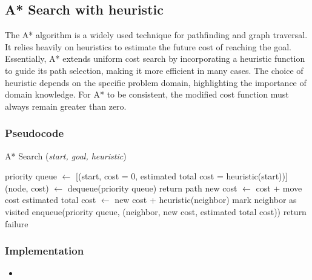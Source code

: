 \subsection{A* Search with heuristic}
\noindent The A* algorithm is a widely used technique for pathfinding and graph traversal. It relies heavily on heuristics to estimate the future cost of reaching the goal. Essentially, A* extends uniform cost search by incorporating a heuristic function to guide its path selection, making it more efficient in many cases. The choice of heuristic depends on the specific problem domain, highlighting the importance of domain knowledge. For A* to be consistent, the modified cost function must always remain greater than zero.

\subsubsection{Pseudocode}
\begin{algorithm}[H]
	\caption{A* Search (\textit{start, goal, heuristic})}
	\label{alg:astar}
	\begin{algorithmic}[1]
		\State priority queue \(\gets\) [(start, cost = 0, estimated total cost = heuristic(start))]
		\State (node, cost) \(\gets\) dequeue(priority queue)
		\State return path
		\EndIf
		\State new cost \(\gets\) cost + move cost
		\State estimated total cost \(\gets\) new cost + heuristic(neighbor)
		\State mark neighbor as visited
		\State enqueue(priority queue, (neighbor, new cost, estimated total cost))
		\EndIf
		\EndFor
		\EndWhile
		\State return failure
	\end{algorithmic}
\end{algorithm}

\subsubsection{Implementation}
\begin{itemize}
	\item
\end{itemize}

